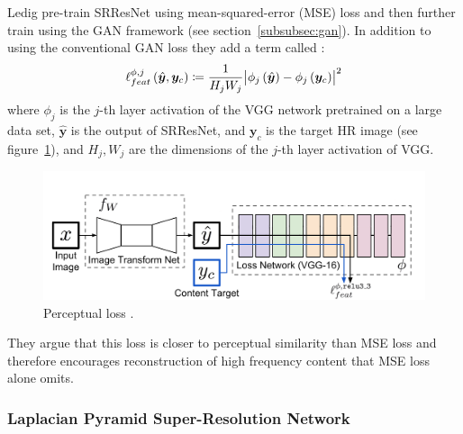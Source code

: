 Ledig \etal pre-train SRResNet using mean-squared-error (MSE) loss and then further train using the GAN framework (see section~\ref{subsubsec:gan}).
%
In addition to using the conventional GAN loss they add a term called :
\begin{equation}
    \ell_{feat}^{\phi, j} \left( \hat{\bm{y}}, \bm{y}_c\right) \coloneqq \frac{1}{H_j W_j} \abs{\phi_j\left({\hat{\bm{y}}}\right) - \phi_j \left(\bm{y}_c\right)}^2
\end{equation}
where \(\phi_j\) is the \(j\)-th layer activation of the VGG network \cite{simonyan2014very} pretrained on a large data set, \(\hat{\bm{y}}\) is the output of SRResNet, and \(\bm{y}_c\) is the target HR image (see figure~\ref{fig:perceptualloss}), and \(H_j, W_j\) are the dimensions of the \(j\)-th layer activation of VGG.
\begin{figure}[!htbp]
    \centering
    \begin{adjustbox}{width=\linewidth}
        \centering
        \includegraphics[]{figures/neural_networks/perceptual_loss.png}
    \end{adjustbox}
    \caption{Perceptual loss \cite{johnson2016perceptual}.}\label{fig:perceptualloss}
\end{figure}
%
They argue that this loss is closer to perceptual similarity than MSE loss and therefore encourages reconstruction of high frequency content that MSE loss alone omits.




\subsubsection{Laplacian Pyramid Super-Resolution Network}\label{subsubsec:lapsrn}




